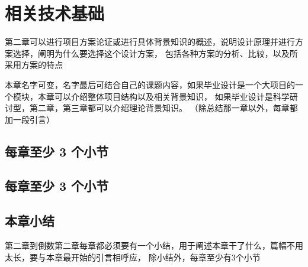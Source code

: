 \section{相关技术基础}
第二章可以进行项目方案论证或进行具体背景知识的概述，说明设计原理并进行方案选择，阐明为什么要选择这个设计方案，
包括各种方案的分析、比较，以及所采用方案的特点

本章名字可变，名字最后可结合自己的课题内容，如果毕业设计是一个大项目的一个模块，本章可以介绍整体项目结构以及相关背景知识，
如果毕业设计是科学研讨型，第二章，第三章都可以介绍理论背景知识。
（除总结那一章以外，每章都加一段引言）

\subsection{每章至少 3 个小节}
\subsection{每章至少 3 个小节}

\subsection{本章小结}
第二章到倒数第二章每章都必须要有一个小结，用于阐述本章干了什么，篇幅不用太长，要与本章最开始的引言相呼应，
除小结外，每章至少有3个小节



